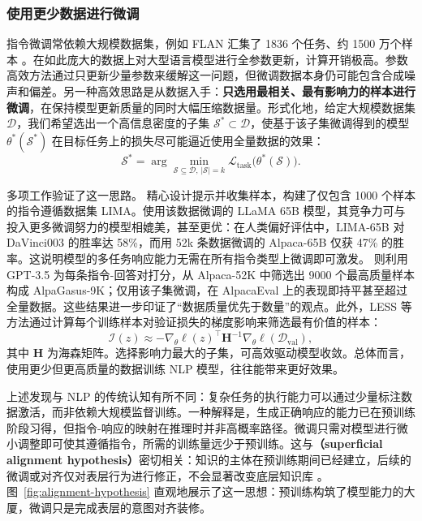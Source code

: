\subsubsection{使用更少数据进行微调}

指令微调常依赖大规模数据集，例如 FLAN 汇集了 1836 个任务、约 1500 万个样本 \cite{longpre-etal:2023flan}。在如此庞大的数据上对大型语言模型进行全参数更新，计算开销极高。参数高效方法通过只更新少量参数来缓解这一问题，但微调数据本身仍可能包含合成噪声和偏差。另一种高效思路是从数据入手：\textbf{只选用最相关、最有影响力的样本进行微调}，在保持模型更新质量的同时大幅压缩数据量。形式化地，给定大规模数据集 $\mathcal{D}$，我们希望选出一个高信息密度的子集 $\mathcal{S}^* \subset \mathcal{D}$，使基于该子集微调得到的模型 $\theta^*(\mathcal{S}^*)$ 在目标任务上的损失尽可能逼近使用全量数据的效果：
\begin{equation}
\mathcal{S}^* = \arg\min_{\mathcal{S}\subseteq\mathcal{D},\,|\mathcal{S}|=k} \mathcal{L}_{\text{task}}\bigl(\theta^*(\mathcal{S})\bigr).
\end{equation}

多项工作验证了这一思路。\citet{zhou-etal:2023lima} 精心设计提示并收集样本，构建了仅包含 1000 个样本的指令遵循数据集 LIMA。使用该数据微调的 LLaMA 65B 模型，其竞争力可与投入更多微调努力的模型相媲美，甚至更优：在人类偏好评估中，LIMA-65B 对 DaVinci003 的胜率达 58\%，而用 52k 条数据微调的 Alpaca-65B 仅获 47\% 的胜率。这说明模型的多任务响应能力无需在所有指令类型上微调即可激发。\citet{chen-etal:2024alpagasus} 则利用 GPT-3.5 为每条指令-回答对打分，从 Alpaca-52K 中筛选出 9000 个最高质量样本构成 AlpaGasus-9K；仅用该子集微调，在 AlpacaEval 上的表现即持平甚至超过全量数据。这些结果进一步印证了“数据质量优先于数量”的观点。此外，LESS 等方法通过计算每个训练样本对验证损失的梯度影响来筛选最有价值的样本：
\begin{equation}
\mathcal{I}(z) \approx -\nabla_\theta \ell(z)^\top \mathbf{H}^{-1} \nabla_\theta \ell(\mathcal{D}_{\text{val}}),
\end{equation}
其中 $\mathbf{H}$ 为海森矩阵。选择影响力最大的子集，可高效驱动模型收敛。总体而言，使用更少但更高质量的数据训练 NLP 模型，往往能带来更好效果。

上述发现与 NLP 的传统认知有所不同：复杂任务的执行能力可以通过少量标注数据激活，而非依赖大规模监督训练。一种解释是，生成正确响应的能力已在预训练阶段习得，但指令-响应的映射在推理时并非高概率路径。微调只需对模型进行微小调整即可使其遵循指令，所需的训练量远少于预训练。这与\textbf{（superficial alignment hypothesis）}密切相关：知识的主体在预训练期间已经建立，后续的微调或对齐仅对表层行为进行修正，不会显著改变底层知识库 \cite{zhou-etal:2023lima}。图~\ref{fig:alignment-hypothesis} 直观地展示了这一思想：预训练构筑了模型能力的大厦，微调只是完成表层的意图对齐装修。

